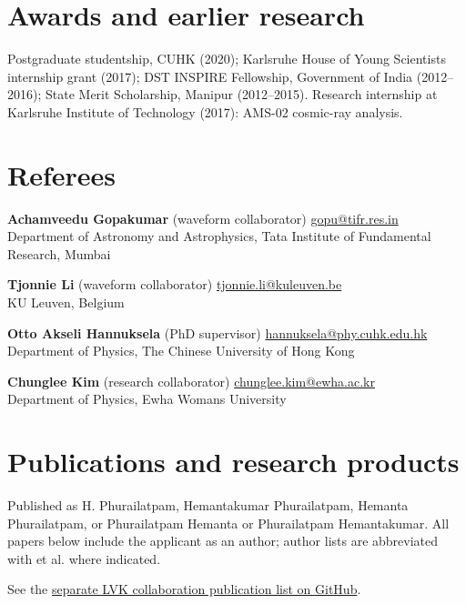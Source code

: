 \documentclass[10pt]{article}
\begin{document}
\section*{Awards and earlier research}
Postgraduate studentship, CUHK (2020); Karlsruhe House of Young Scientists internship grant (2017); DST INSPIRE Fellowship, Government of India (2012--2016); State Merit Scholarship, Manipur (2012--2015). Research internship at Karlsruhe Institute of Technology (2017): AMS-02 cosmic-ray analysis.
\section*{Referees}
\textbf{Achamveedu Gopakumar} (waveform collaborator) \quad \href{mailto:gopu@tifr.res.in}{gopu@tifr.res.in}\\
Department of Astronomy and Astrophysics, Tata Institute of Fundamental Research, Mumbai

\smallskip
\textbf{Tjonnie Li} (waveform collaborator) \quad \href{mailto:tjonnie.li@kuleuven.be}{tjonnie.li@kuleuven.be}\\
KU Leuven, Belgium

\smallskip
\textbf{Otto Akseli Hannuksela} (PhD supervisor) \quad \href{mailto:hannuksela@phy.cuhk.edu.hk}{hannuksela@phy.cuhk.edu.hk}\\
Department of Physics, The Chinese University of Hong Kong

\smallskip
\textbf{Chunglee Kim} (research collaborator) \quad \href{mailto:chunglee.kim@ewha.ac.kr}{chunglee.kim@ewha.ac.kr}\\
Department of Physics, Ewha Womans University
\newpage
\section*{Publications and research products}
Published as H. Phurailatpam, Hemantakumar Phurailatpam, Hemanta Phurailatpam, or Phurailatpam Hemanta or Phurailatpam Hemantakumar. All papers below include the applicant as an author; author lists are abbreviated with et al. where indicated.
\par See the \href{https://github.com/hemantaph/resume/blob/main/LVK_resume_common/LVK_Collaboration_Publications.pdf}{separate LVK collaboration publication list on GitHub}.
\end{document}
